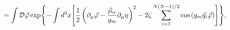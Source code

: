 \begin{equation}
\label{alphaa}
=\int {\cal D}\vec\varphi\exp\Biggl\{-\int d^3x\Biggl[\frac12\left(\partial_\mu\vec\varphi-\frac{\vec\mu_\alpha}{g_m}
\partial_\mu\eta\right)^2-2\zeta\sum\limits_{i=1}^{N(N-1)/2}
\cos\left(g_m\vec q_i\vec\varphi\right)\Biggr]\Biggr\},
\end{equation}

